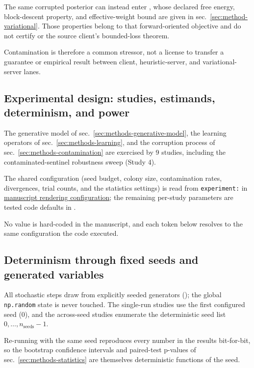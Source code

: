 \documentclass[
  english,
]{article}
\theoremstyle{plain}
\theoremstyle{definition}
\theoremstyle{remark}
\theoremstyle{definition}
\begin{document}
The same corrupted posterior can instead enter
, whose declared free energy,
block-descent property, and effective-weight bound are given in
sec.~\ref{sec:method-variational}. Those properties belong to that
forward-oriented objective and do not certify 
or the source client's bounded-loss theorem.

Contamination is therefore a common stressor, not a license to transfer
a guarantee or empirical result between client, heuristic-server, and
variational-server lanes.

\subsection{Experimental design: studies, estimands, determinism, and
power}\label{sec:methods-experimental-design}

The generative model of sec.~\ref{sec:methods-generative-model}, the
learning operators of sec.~\ref{sec:methods-learning}, and the
corruption process of sec.~\ref{sec:methods-contamination} are exercised
by 9 studies, including the contaminated-sentinel robustness sweep
(Study 4).

The shared configuration (seed budget, colony size, contamination rates,
divergences, trial counts, and the statistics settings) is read from
\texttt{experiment:} in
\href{https://github.com/ActiveInferenceInstitute/Active_Fedference/blob/main/manuscript/config.yaml}{manuscript
rendering configuration}; the remaining per-study parameters are tested
code defaults in .

No value is hard-coded in the manuscript, and each token below resolves
to the same configuration the code executed.

\subsection{Determinism through fixed seeds and generated
variables}\label{sec:methods-determinism}

All stochastic steps draw from explicitly seeded generators
(); the global \texttt{np.random} state
is never touched. The single-run studies use the first configured seed
(0), and the across-seed studies enumerate the deterministic seed list
\(0,\ldots,n_{\text{seeds}}-1\).

Re-running with the same seed reproduces every number in the results
bit-for-bit, so the bootstrap confidence intervals and paired-test
p-values of sec.~\ref{sec:methods-statistics} are themselves
deterministic functions of the seed.
\end{document}
